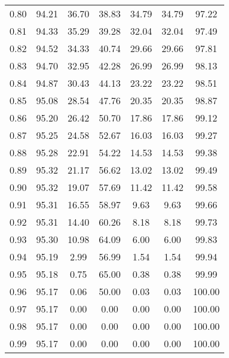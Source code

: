 \begin{tabular}{|c|c|c|c|c|c|c|}
      0.80 &     94.21 &     36.70 &      38.83 &   34.79 &      34.79 &         97.22 \\
      0.81 &     94.33 &     35.29 &      39.28 &   32.04 &      32.04 &         97.49 \\
      0.82 &     94.52 &     34.33 &      40.74 &   29.66 &      29.66 &         97.81 \\
      0.83 &     94.70 &     32.95 &      42.28 &   26.99 &      26.99 &         98.13 \\
      0.84 &     94.87 &     30.43 &      44.13 &   23.22 &      23.22 &         98.51 \\
      0.85 &     95.08 &     28.54 &      47.76 &   20.35 &      20.35 &         98.87 \\
      0.86 &     95.20 &     26.42 &      50.70 &   17.86 &      17.86 &         99.12 \\
      0.87 &     95.25 &     24.58 &      52.67 &   16.03 &      16.03 &         99.27 \\
      0.88 &     95.28 &     22.91 &      54.22 &   14.53 &      14.53 &         99.38 \\
      0.89 &     95.32 &     21.17 &      56.62 &   13.02 &      13.02 &         99.49 \\
      0.90 &     95.32 &     19.07 &      57.69 &   11.42 &      11.42 &         99.58 \\
      0.91 &     95.31 &     16.55 &      58.97 &    9.63 &       9.63 &         99.66 \\
      0.92 &     95.31 &     14.40 &      60.26 &    8.18 &       8.18 &         99.73 \\
      0.93 &     95.30 &     10.98 &      64.09 &    6.00 &       6.00 &         99.83 \\
      0.94 &     95.19 &      2.99 &      56.99 &    1.54 &       1.54 &         99.94 \\
      0.95 &     95.18 &      0.75 &      65.00 &    0.38 &       0.38 &         99.99 \\
      0.96 &     95.17 &      0.06 &      50.00 &    0.03 &       0.03 &        100.00 \\
      0.97 &     95.17 &      0.00 &       0.00 &    0.00 &       0.00 &        100.00 \\
      0.98 &     95.17 &      0.00 &       0.00 &    0.00 &       0.00 &        100.00 \\
      0.99 &     95.17 &      0.00 &       0.00 &    0.00 &       0.00 &        100.00 \\
\bottomrule
\end{tabular}
